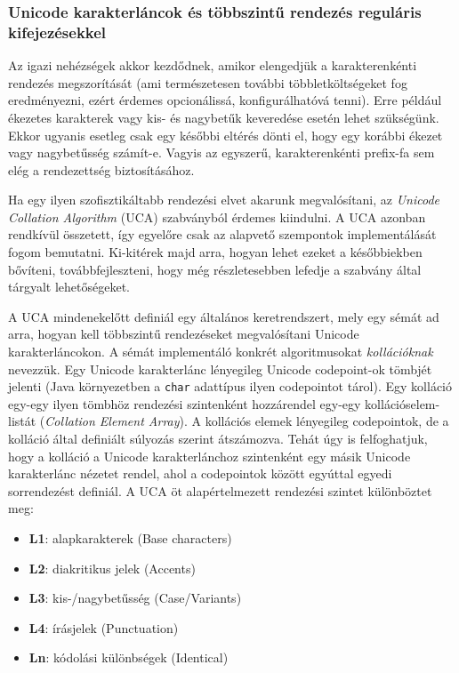 \documentclass[
    parspace,
    noindent,
    nohyp,
]{elteiktdk}[2023/04/10]
\begin{document}
\subsubsection{Unicode karakterláncok és többszintű rendezés reguláris kifejezésekkel}

Az igazi nehézségek akkor kezdődnek,
amikor elengedjük a karakterenkénti rendezés megszorítását
(ami természetesen további többletköltségeket fog eredményezni,
ezért érdemes opcionálissá, konfigurálhatóvá tenni).
Erre például ékezetes karakterek vagy kis- és nagybetűk keveredése esetén lehet szükségünk.
Ekkor ugyanis esetleg csak egy későbbi eltérés dönti el,
hogy egy korábbi ékezet vagy nagybetűsség számít-e.
Vagyis az egyszerű, karakterenkénti prefix-fa sem elég a rendezettség biztosításához.

Ha egy ilyen szofisztikáltabb rendezési elvet akarunk megvalósítani,
az \textit{Unicode Collation Algorithm} (UCA) szabványból érdemes kiindulni\protect\cite{UCA2024}.
A UCA azonban rendkívül összetett,
így egyelőre csak az alapvető szempontok implementálását fogom bemutatni.
Ki-kitérek majd arra, hogyan lehet ezeket a későbbiekben bővíteni, továbbfejleszteni,
hogy még részletesebben lefedje a szabvány által tárgyalt lehetőségeket.

A UCA mindenekelőtt definiál egy általános keretrendszert,
mely egy sémát ad arra, hogyan kell többszintű rendezéseket megvalósítani Unicode karakterláncokon.
A sémát implementáló konkrét algoritmusokat \textit{kollációknak} nevezzük.
Egy Unicode karakterlánc lényegileg Unicode codepoint-ok tömbjét jelenti
(Java környezetben a \texttt{char} adattípus ilyen codepointot tárol).
Egy kolláció egy-egy ilyen tömbhöz rendezési szintenként hozzárendel egy-egy
kollációselem-listát (\textit{Collation Element Array}).
A kollációs elemek lényegileg codepointok, de a kolláció által definiált súlyozás szerint átszámozva.
Tehát úgy is felfoghatjuk, hogy a kolláció a Unicode karakterlánchoz
szintenként egy másik Unicode karakterlánc nézetet rendel,
ahol a codepointok között egyúttal egyedi sorrendezést definiál.
A UCA öt alapértelmezett rendezési szintet különböztet meg:

\begin{itemize}
    \item \textbf{L1}: alapkarakterek (Base characters)
    \item \textbf{L2}: diakritikus jelek (Accents)
    \item \textbf{L3}: kis-/nagybetűsség (Case/Variants)
    \item \textbf{L4}: írásjelek (Punctuation)
    \item \textbf{Ln}: kódolási különbségek (Identical)
\end{itemize}
\end{document}
